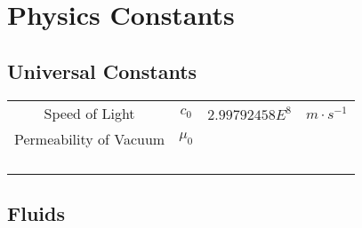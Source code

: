 \section{Physics Constants}
\subsection{Universal Constants}

\begin{tabular}{cccc}
	\hline 
	Speed of Light & $c_0$ & $2.99792458E^{8}$ & $m\cdot s^{-1}$ \\ 
	Permeability of Vacuum & $\mu_0$ &  &  \\ 
		&  &  &  \\ 
		&  &  &  \\ 
		&  &  &  \\ 
		&  &  &  \\ 
	\hline 
	\end{tabular} 
\subsection{Fluids}